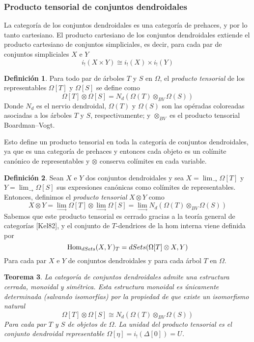 \documentclass[11pt,a4paper,openright,oneside]{article}
\numberwithin{equation}{section}
\newtheorem{teo}{Teorema}[section]
\theoremstyle{definition}
\newtheorem{defi}[teo]{Definici\'on}
\begin{document}
\subsubsection{Producto tensorial de conjuntos dendroidales}
La categor\'ia de los conjuntos dendroidales es una categor\'ia de prehaces, y por lo tanto cartesiano.
El producto cartesiano de los conjuntos dendroidales extiende el producto cartesiano de conjuntos simpliciales, es decir, para cada par de conjuntos simpliciales $X$ e $Y$
$$
    i_!(X\times Y) \cong i_!(X)\times i_!(Y)
$$
\begin{defi}
    Para todo par de \'arboles $T$ y $S$ en $\Omega$, el \emph{producto tensorial} de los representables $\Omega[T]$ y $\Omega[S]$ se define como
    $$
        \Omega[T]\otimes\Omega[S] = N_d(\Omega(T)\otimes_{BV}\Omega(S))
    $$
    Donde $N_d$ es el nervio dendroidal, $\Omega(T)$ y $\Omega(S)$ son las op\'eradas coloreadas asociadas a los \'arboles $T$ y $S$, respectivamente; y $\otimes_{BV}$ es el producto tensorial Boardman--Vogt.

    Esto define un producto tensorial en toda la categor\'ia de conjuntos dendroidales, ya que es una categor\'ia de prehaces y entonces cada objeto es un col\'imite can\'onico de representables y $\otimes$ conserva col\'imites en cada variable.
\end{defi}
\begin{defi}
    Sean $X$ e $Y$ dos conjuntos dendroidales y sea $X = \lim_{\to}\Omega[T]$ y $Y = \lim_{\to}\Omega[S]$ sus expresiones can\'onicas como col\'imites de representables. Entonces, definimos el \emph{producto tensorial} $X\otimes Y$ como
    $$
        X\otimes Y = \lim_{\to}\Omega[T]\otimes\lim_{\to}\Omega[S] = \lim_{\to} N_d(\Omega(T)\otimes_{BV}\Omega(S))
    $$
    Sabemos que este producto tensorial es cerrado gracias a la teor\'ia general de categor\'ias [Kel82], y el conjunto de $T$-dendrices de la hom interna viene definida por
    $$
        {\rm Hom}_{dSets}(X,Y)_T = dSets(\Omega[T]\otimes X, Y)
    $$
    Para cada par $X$ e $Y$ de conjuntos dendroidales y para cada \'arbol $T$ en $\Omega$.
\end{defi}
\begin{teo}
    La categor\'ia de conjuntos dendroidales admite una estructura cerrada, monoidal y sim\'etrica. Esta estructura monoidal es \'unicamente determinada (salvando isomorf\'ias) por la propiedad de que existe un isomorfismo natural
    $$
        \Omega[T]\otimes\Omega[S] \cong N_d(\Omega(T)\otimes_{BV}\Omega(S))
    $$
    Para cada par $T$ y $S$ de objetos de $\Omega$. La unidad del producto tensorial es el conjunto dendroidal representable $\Omega[\eta]=i_!(\Delta[0]) = U$.
\end{teo}
\end{document}
